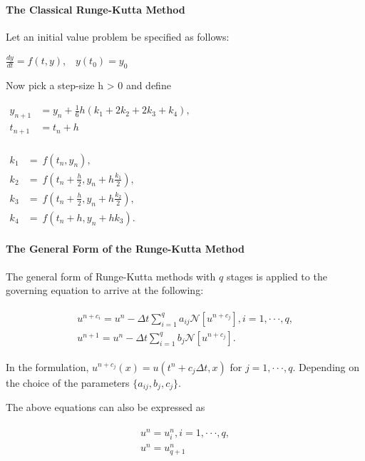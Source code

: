\documentclass[book.tex]{subfiles}
\begin{document}
\paragraph{The Classical Runge-Kutta
Method}\label{the-classical-runge-kutta-method}

Let an initial value problem be specified as follows:

$\frac{dy}{dt}=f(t,y)$,$\quad y(t_{0})=y_{0}$

Now pick a step-size h \textgreater{} 0 and define

$\begin{aligned}y_{n+1}&=y_{n}+{\frac {1}{6}}h\left(k_{1}+2k_{2}+2k_{3}+k_{4}\right),\\t_{n+1}&=t_{n}+h\\\end{aligned}$

$
\begin{aligned}k_{1}&=\ f(t_{n},y_{n}),\\k_{2}&=\ f\left(t_{n}+{\frac {h}{2}},y_{n}+h{\frac {k_{1}}{2}}\right),\\k_{3}&=\ f\left(t_{n}+{\frac {h}{2}},y_{n}+h{\frac {k_{2}}{2}}\right),\\k_{4}&=\ f\left(t_{n}+h,y_{n}+hk_{3}\right).\end{aligned}
$
\paragraph{The General Form of the Runge-Kutta
Method}\label{the-general-runge-kutta-method}
The general form of Runge-Kutta methods with $q$ stages is applied to the governing equation to arrive at the following:

\begin{align}
    \begin{split}
        u^{n+c_i}=u^n-\Delta t\sum_{i=1}^{q}a_{ij}\mathcal{N}[u^{n+c_j}], i=1,\cdot\cdot\cdot,q,\\
        u^{n+1}=u^n-\Delta t\sum_{i=1}^{q}b_{j}\mathcal{N}[u^{n+c_j}].
    \end{split}
\end{align}

In the formulation, $u^{n+c_j}(x)=u(t^n+c_j\Delta t,x)$ for $j=1,\cdot\cdot\cdot,q$. Depending on the choice of the parameters $\{a_{ij},b_j,c_j\}$.

The above equations can also be expressed as

\begin{align}
    \begin{split}
        u^n=u^n_i, i=1,\cdot\cdot\cdot,q,\\
        u^n=u^n_{q+1}
    \end{split}
\end{align}
\end{document}

